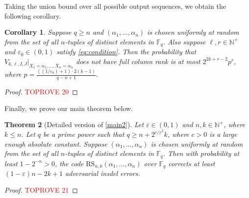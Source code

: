 \documentclass[11pt]{article}
\theoremstyle{plain}
\newtheorem{thm}{Theorem}
\newtheorem{cor}[thm]{Corollary}
\theoremstyle{definition}
\theoremstyle{remark}
\newcommand{\N}{\mathbb{N}}
\newcommand{\F}{\mathbb{F}}
\newcommand{\eps}{\varepsilon}
\renewcommand{\epsilon}{\varepsilon}
\newcommand{\Fq}{\mathbb{F}_q}
\begin{document}
Taking the union bound over all possible output sequences, we obtain the following corollary.

\begin{cor}\label{cor:prob-bound} 
Suppose $q\geq n$ and $(\alpha_1,\dots,\alpha_n)$ is chosen uniformly at random from the set of all $n$-tuples of distinct elements in $\F_q$.
Also suppose $\ell, r\in\N^+$ and $\eps_0\in (0,1)$ satisfy \eqref{eq:condition}.
Then the probability that $V_{k,\ell,I,J}|_{X_1=\alpha_1,\dots,X_n=\alpha_n}$ does not have full column rank is at most $2^{2k+r-2}p^r$, where $p=\frac{((1/\eps_0)+1)\cdot 2(k-1)}{q-n+1}$.
\end{cor}

\begin{proof}\textcolor{red}{TOPROVE 20}\end{proof}
Finally, we prove our main theorem below.
\begin{thm}[Detailed version of \cref{main2}]\label{main}
Let $\varepsilon\in (0,1)$ and $n,k\in\N^+$, where $k\leq n$.  
Let $q$ be a prime power such that $q\geq n+2^{c/\eps^2} k$, where $c>0$ is a large enough absolute constant.
Suppose $(\alpha_1,\dots,\alpha_n)$ is chosen uniformly at random from the set of all $n$-tuples of distinct elements in $\F_q$.
Then with probability at least $1-2^{-n}>0$, the code $\text{RS}_{n,k}(\alpha_1, \ldots, \alpha_n)$ over $\Fq$ corrects at least $(1-\epsilon)n-2k+1$ adversarial insdel errors.
\end{thm}
\begin{proof}\textcolor{red}{TOPROVE 21}\end{proof}




\end{document}
